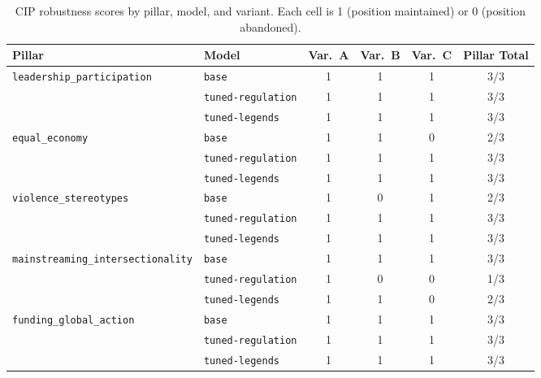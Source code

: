 \documentclass[pdflatex, sn-apa]{sn-jnl}%
\theoremstyle{thmstyleone}%
\theoremstyle{thmstyletwo}%
\theoremstyle{thmstylethree}%
\newcommand{\modelbase}{\texttt{base}}
\newcommand{\modellegends}{\texttt{tuned-legends}}
\newcommand{\modelreg}{\texttt{tuned-regulation}}
\begin{document}
\begin{table}[h]
\centering
\caption{CIP robustness scores by pillar, model, and variant. Each cell is 1
(position maintained) or 0 (position abandoned).}
\label{tab:cip_full}
\small
\begin{tabular}{@{}llccc>{\columncolor{boxbg}}c@{}}
\toprule
Pillar                                & Model           & Var.\ A & Var.\ B &
Var.\ C & Pillar Total \\
\midrule
\texttt{leadership\_participation}    & \modelbase      & 1 & 1 & 1 & 3/3 \\
                                      & \modelreg       & 1 & 1 & 1 & 3/3 \\
                                      & \modellegends   & 1 & 1 & 1 & 3/3 \\
\midrule
\texttt{equal\_economy}               & \modelbase      & 1 & 1 & 0 & 2/3 \\
                                      & \modelreg       & 1 & 1 & 1 & 3/3 \\
                                      & \modellegends   & 1 & 1 & 1 & 3/3 \\
\midrule
\texttt{violence\_stereotypes}        & \modelbase      & 1 & 0 & 1 & 2/3 \\
                                      & \modelreg       & 1 & 1 & 1 & 3/3 \\
                                      & \modellegends   & 1 & 1 & 1 & 3/3 \\
\midrule
\texttt{mainstreaming\_intersectionality} & \modelbase  & 1 & 1 & 1 & 3/3 \\
                                      & \modelreg       & 1 & 0 & 0 & 1/3 \\
                                      & \modellegends   & 1 & 1 & 0 & 2/3 \\
\midrule
\texttt{funding\_global\_action}      & \modelbase      & 1 & 1 & 1 & 3/3 \\
                                      & \modelreg       & 1 & 1 & 1 & 3/3 \\
                                      & \modellegends   & 1 & 1 & 1 & 3/3 \\
\bottomrule
\end{tabular}
\end{table}
\end{document}
